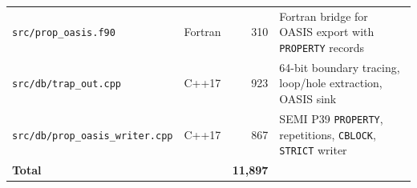 \begin{table}[htbp]
\begin{tabular}{@{}llrl@{}}
\texttt{src/prop\_oasis.f90} & Fortran & 310 & Fortran bridge for OASIS export with \texttt{PROPERTY} records \\
\texttt{src/db/trap\_out.cpp} & C++17 & 923 & 64-bit boundary tracing, loop/hole extraction, OASIS sink \\
\texttt{src/db/prop\_oasis\_writer.cpp} & C++17 & 867 & SEMI P39 \texttt{PROPERTY}, repetitions, \texttt{CBLOCK}, \texttt{STRICT} writer \\
\midrule
\textbf{Total} & & \textbf{11,897} & \\
\bottomrule
\end{tabular}
\end{table}
